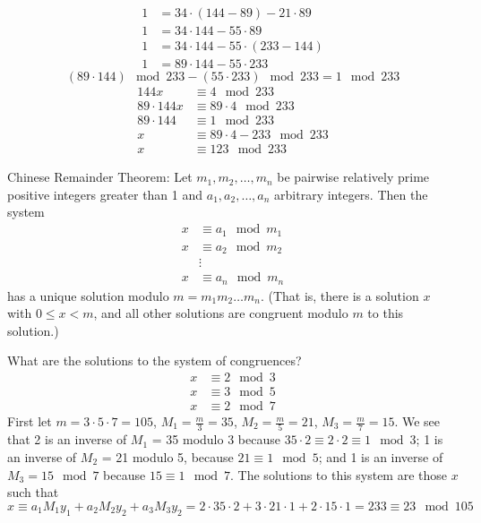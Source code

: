 \documentclass[12pt]{article}
\begin{document}
\begin{example}
$$\begin{aligned}
1 &= 34 \cdot (144 - 89) - 21 \cdot 89 \\ 
1 &= 34 \cdot 144 - 55 \cdot 89 \\ 
1 &= 34 \cdot 144 - 55 \cdot (233 - 144) \\ 
1 &= 89 \cdot 144 - 55 \cdot 233 \end{aligned} $$
$$ (89 \cdot 144)\mod 233 - (55 \cdot 233) \mod 233 = 1 \mod 233 $$ 
$$\begin{aligned} 
144x &\equiv 4 \mod 233 \\
89 \cdot 144x &\equiv 89 \cdot 4 \mod 233 \\
89 \cdot 144 &\equiv 1 \mod 233 \\
x &\equiv 89 \cdot 4 - 233 \mod 233 \\
x &\equiv 123 \mod 233 \end{aligned} $$ 
\end{example} 
\begin{theorem} Chinese Remainder Theorem: Let $m_1, m_2, \dots, m_n$ be pairwise relatively prime positive integers greater than 1 and $a_1, a_2, \dots, a_n$ arbitrary integers. Then the system $$\begin{aligned} x &\equiv a_1 \mod m_1 \\ x &\equiv a_2 \mod m_2 \\ &\vdots \\ x &\equiv a_n \mod m_n \end{aligned} $$ has a unique solution modulo $m = m_1m_2\dots m_n$. (That is, there is a solution $x$ with $0 \leq x < m$, and all other solutions are congruent modulo $m$ to this solution.) \end{theorem} 
\begin{example} What are the solutions to the system of congruences? $$\begin{aligned} x &\equiv 2 \mod 3 \\ x &\equiv 3 \mod 5 \\ x &\equiv 2 \mod 7 \end{aligned} $$ First let $m = 3 \cdot 5 \cdot 7 = 105$, $M_1 = \frac{m}{3} = 35$, $M_2 = \frac{m}{5} = 21$, $M_3 = \frac{m}{7} = 15$. We see that 2 is an inverse of $M_1$ = 35 modulo 3 because $35 \cdot 2 \equiv 2 \cdot 2 \equiv 1 \mod 3$; 1 is an inverse of $M_2$ = 21 modulo 5, because $21 \equiv 1 \mod 5$; and 1 is an inverse of $M_3 = 15 \mod 7$ because $15 \equiv 1 \mod 7$. The solutions to this system are those $x$ such that $$x \equiv a_1M_1y_1 + a_2M_2y_2 + a_3M_3y_2 = 2 \cdot 35 \cdot 2 + 3 \cdot 21 \cdot 1 + 2 \cdot 15 \cdot 1 = 233 \equiv 23 \mod 105 $$ \end{example} 
\end{document}
